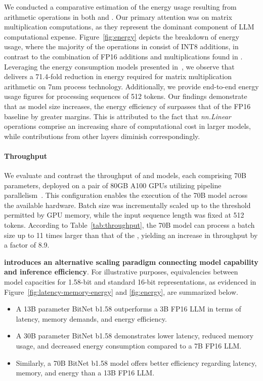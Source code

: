 We conducted a comparative estimation of the energy usage resulting from arithmetic operations in both  and . Our primary attention was on matrix multiplication computations, as they represent the dominant component of LLM computational expense. Figure~\ref{fig:energy} depicts the breakdown of energy usage, where the majority of the operations in  consist of INT8 additions, in contrast to the combination of FP16 additions and multiplications found in . Leveraging the energy consumption models presented in~\cite{energycost, pokebnn}, we observe that  delivers a 71.4-fold reduction in energy required for matrix multiplication arithmetic on 7nm process technology. Additionally, we provide end-to-end energy usage figures for processing sequences of 512 tokens. Our findings demonstrate that as model size increases, the energy efficiency of  surpasses that of the FP16  baseline by greater margins. This is attributed to the fact that \emph{nn.Linear} operations comprise an increasing share of computational cost in larger models, while contributions from other layers diminish correspondingly.

\paragraph{Throughput}

We evaluate and contrast the throughput of  and  models, each comprising 70B parameters, deployed on a pair of 80GB A100 GPUs utilizing pipeline parallelism~\cite{gpipe}. This configuration enables the execution of the  70B model across the available hardware. Batch size was incrementally scaled up to the threshold permitted by GPU memory, while the input sequence length was fixed at 512 tokens. According to Table~\ref{tab:throughput}, the  70B model can process a batch size up to 11 times larger than that of the , yielding an increase in throughput by a factor of 8.9.

\textbf{ introduces an alternative scaling paradigm connecting model capability and inference efficiency}. For illustrative purposes, equivalencies between model capacities for 1.58-bit and standard 16-bit representations, as evidenced in Figure~\ref{fig:latency-memory-energy} and \ref{fig:energy}, are summarized below.

\begin{itemize}
    \item A 13B parameter BitNet b1.58 outperforms a 3B FP16 LLM in terms of latency, memory demands, and energy efficiency.
    \item A 30B parameter BitNet b1.58 demonstrates lower latency, reduced memory usage, and decreased energy consumption compared to a 7B FP16 LLM.
    \item Similarly, a 70B BitNet b1.58 model offers better efficiency regarding latency, memory, and energy than a 13B FP16 LLM.
\end{itemize}

